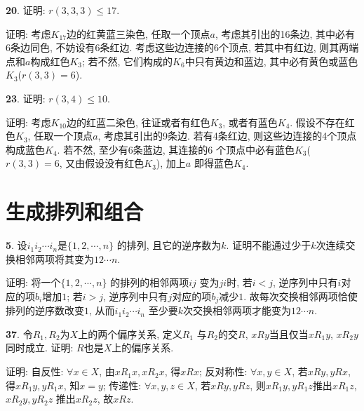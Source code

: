 \par \textbf{20}. 证明: $r(3,3,3)\le 17$.
\par 证明: 考虑$K_{17}$边的红黄蓝三染色, 任取一个顶点$a$, 考虑其引出的16条边, 其中必有6条边同色, 不妨设有6条红边. 考虑这些边连接的6个顶点, 若其中有红边, 则其两端点和$a$构成红色$K_3$; 若不然, 它们构成的$K_6$中只有黄边和蓝边, 其中必有黄色或蓝色$K_3$($r(3,3)=6$).

\par \textbf{23}. 证明: $r(3,4)\le 10$.
\par 证明: 考虑$K_{10}$边的红蓝二染色, 往证或者有红色$K_3$, 或者有蓝色$K_4$. 假设不存在红色$K_3$, 任取一个顶点$a$, 考虑其引出的9条边. 若有4条红边, 则这些边连接的4个顶点构成蓝色$K_4$. 若不然, 至少有6条蓝边, 其连接的6 个顶点中必有蓝色$K_3$($r(3,3)=6$, 又由假设没有红色$K_3$), 加上$a$ 即得蓝色$K_4$.

\section{生成排列和组合}
\par \textbf{5}. 设$i_1 i_2\cdots i_n$是$\{1,2,\cdots,n\}$ 的排列, 且它的逆序数为$k$. 证明不能通过少于$k$次连续交换相邻两项将其变为$12\cdots n$.
\par 证明: 将一个$\{1,2,\cdots,n\}$ 的排列的相邻两项$ij$ 变为$ji$时, 若$i<j$, 逆序列中只有$i$对应的项$b_i$增加$1$; 若$i>j$, 逆序列中只有$j$对应的项$b_j$减少$1$. 故每次交换相邻两项恰使排列的逆序数改变$1$, 从而$i_1 i_2\cdots i_n$ 至少要$k$次交换相邻两项才能变为$12\cdots n$.

\par \textbf{37}. 令$R_1,R_2$为$X$上的两个偏序关系, 定义$R_1$ 与$R_2$的交$R$, $xRy$当且仅当$xR_1y$, $xR_2y$ 同时成立. 证明: $R$也是$X$上的偏序关系.
\par 证明: 自反性: $\forall x \in X$, 由$xR_1x, xR_2x$, 得$xRx$; 反对称性: $\forall x,y \in X$, 若$xRy, yRx$, 得$xR_1y, yR_1x$, 知$x=y$; 传递性: $\forall x,y,z \in X$, 若$xRy, yRz$, 则$xR_1y, yR_1z$推出$xR_1z$, $xR_2y, yR_2z$ 推出$xR_2z$, 故$xRz$.

